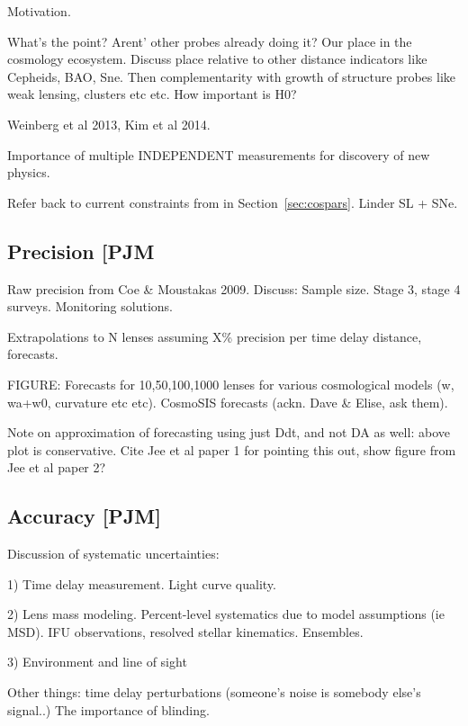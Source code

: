 Motivation.



What's the point? Arent' other probes already doing it? Our place in the
cosmology ecosystem. Discuss place relative to other distance indicators
like Cepheids, BAO, Sne. Then complementarity with growth of structure
probes like weak lensing, clusters etc etc. How important is H0?

Weinberg et al 2013, Kim et al 2014.

Importance of multiple INDEPENDENT measurements for discovery of new
physics.

Refer back to current constraints from \citet{Suy++13} in Section~\ref{sec:cospars}.
Linder SL + SNe.



\subsection{Precision [PJM}

Raw precision from Coe \& Moustakas 2009.
Discuss: Sample size. Stage 3, stage 4 surveys. Monitoring solutions.

Extrapolations to N lenses assuming X\% precision per time delay
distance, forecasts.

FIGURE: Forecasts for 10,50,100,1000 lenses for various cosmological
models (w, wa+w0, curvature etc etc). CosmoSIS forecasts (ackn. Dave \&
Elise, ask them).

Note on approximation of forecasting using just Ddt,
and not DA as well: above plot is conservative.
Cite Jee et al paper 1 for pointing this out,
show figure from Jee et al paper 2?



\subsection{Accuracy [PJM]}

Discussion of systematic uncertainties:

1) Time delay measurement. Light curve quality.

2) Lens mass modeling. Percent-level systematics due to model
assumptions (ie MSD). IFU observations, resolved stellar kinematics.
Ensembles.

3) Environment and line of sight

Other things: time delay perturbations (someone's noise is somebody else's signal..)
The importance of blinding.
